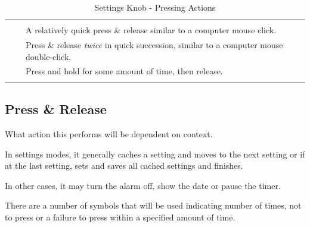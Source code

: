 \begin{table}[H]
\begin{tabu}{ X[2,c,m] | X[1,c,m] | X[4,l,m] }
  \thrule
   &  &  \\ \mrule
  \hyperref[Press and Release]{}
    &  & A relatively quick press \& release
    similar to a computer mouse click. \\ 
  \hyperref[Double-Click]{}
    &  & Press \& release \textit{twice} in quick
    succession, similar to a computer mouse double-click. \\ 
  \hyperref[Press and Hold]{}
    &  & Press and hold for some amount of time,
    then release. \\
  \bhrule
\end{tabu}
\caption {Settings Knob - Pressing Actions}
\end{table}

\subsection{Press \& Release} \label{Press and Release}

What action this performs will be dependent on context.

\par\medskip

In settings modes, it generally caches a setting and moves to the next setting
or if at the last setting, sets and saves all cached settings and finishes.

\par\medskip

In other cases, it may turn the alarm off, show the date or pause the timer.

\par\medskip

There are a number of symbols that will be used indicating number of times, not
to press or a failure to press within a specified amount of time.

